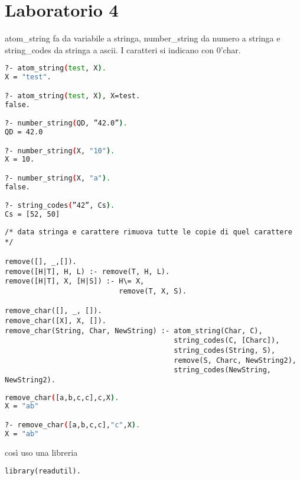 \documentclass[a4paper,12pt, oneside]{book}
\begin{document}
\section{Laboratorio 4}
atom\_string fa da variabile a stringa, number\_string da numero a stringa e string\_codes da stringa a ascii. I caratteri si indicano con 0'char.
\begin{shaded}
\begin{lstlisting}[language=bash]
?- atom_string(test, X).
X = "test".

?- atom_string(test, X), X=test.
false.

?- number_string(QD, ”42.0”).
QD = 42.0

?- number_string(X, "10").
X = 10.

?- number_string(X, "a").
false.

?- string_codes(”42”, Cs).
Cs = [52, 50]
\end{lstlisting}
\end{shaded}
\begin{esercizio}
\begin{verbatim}
/* data stringa e carattere rimuova tutte le copie di quel carattere */

remove([], _,[]).
remove([H|T], H, L) :- remove(T, H, L).
remove([H|T], X, [H|S]) :- H\= X,
                           remove(T, X, S).

remove_char([], _, []).
remove_char([X], X, []).
remove_char(String, Char, NewString) :- atom_string(Char, C),
                                        string_codes(C, [Charc]),
                                        string_codes(String, S),
                                        remove(S, Charc, NewString2),
                                        string_codes(NewString, NewString2).
\end{verbatim}
\begin{shaded}
\begin{lstlisting}[language=bash]
remove_char([a,b,c,c],c,X).
X = "ab"

?- remove_char([a,b,c,c],"c",X).
X = "ab" 
\end{lstlisting}
\end{shaded}
\end{esercizio}
così uso una libreria
\begin{verbatim}
library(readutil).
\end{verbatim}
\end{document}
